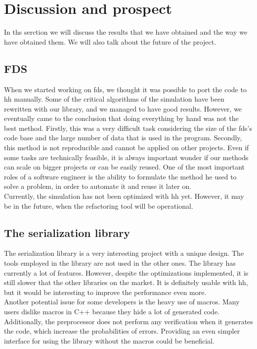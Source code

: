 
\clearpage
\section{Discussion and prospect}

In ths serction we will discuss the results that we have obtained and the way we
have obtained them. We will also talk about the future of the project.

\subsection{FDS}

When we started working on \gls{fds}, we thought it was possible to port the
code to \gls{hh} manually. Some of the critical algorithms of the simulation
have been rewritten with our library, and we managed to have good results.
However, we eventually came to the conclusion that doing everything by hand was
not the best method. Firstly, this was a very difficult task considering the
size of the \gls{fds}'s code base and the large number of data that is used in
the program. Secondly, this method is not reproducible and cannot be applied on
other projects. Even if some tasks are technically feasible, it is always
important wonder if our methods can scale on bigger projects or can be easily
reused. One of the most important roles of a software engineer is the ability to
formulate the method he used to solve a problem, in order to automate it and
reuse it later on.\\

Currently, the simulation has not been optimized with \gls{hh} yet. However, it
may be in the future, when the refactoring tool will be operational.

\subsection{The serialization library}

The serialization library is a very interesting project with a unique design.
The tools employed in the library are not used in the other ones. The library
has currently a lot of features. However, despite the optimizations implemented,
it is still slower that the other libraries on the market. It is definitely
usable with \gls{hh}, but it would be interesting to improve the performance
even more.\\

Another potential issue for some developers is the heavy use of macros. Many
users dislike macros in C++ because they hide a lot of generated code.
Additionally, the preprocessor does not perform any verification when it
generates the code, which increase the probabilities of errors. Providing an
even simpler interface for using the library without the macros could be
beneficial.
